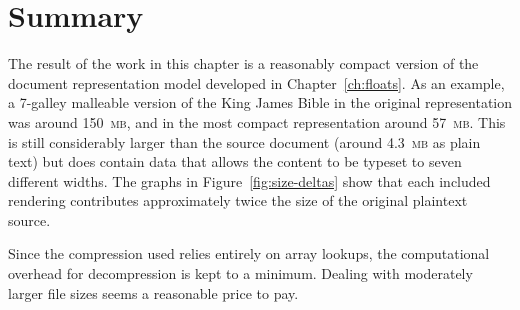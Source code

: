 \section{Summary}

The result of the work in this chapter is a reasonably compact version of the document representation model developed in Chapter~\ref{ch:floats}. As an example, a 7-\gls{galley} malleable version of the King James Bible in the original representation was around 150~\textsc{mb}, and in the most compact representation around 57~\textsc{mb}. This is still considerably larger than the source document (around 4.3~\textsc{mb} as plain text) but does contain data that allows the content to be typeset to seven different widths. The graphs in Figure~\ref{fig:size-deltas} show that each included rendering contributes approximately twice the size of the original plaintext source.

Since the compression used relies entirely on array lookups, the computational overhead for decompression is kept to a minimum. Dealing with moderately larger file sizes seems a reasonable price to pay.
